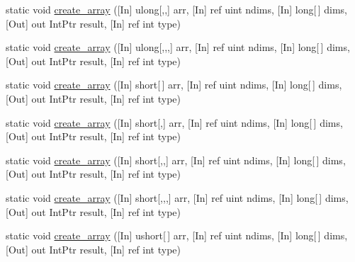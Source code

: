 \begin{DoxyCompactItemize}
\item 
static void \mbox{\hyperlink{classkhiva_1_1interop_1_1_d_l_l_array_abc6c56698c77e653f55a0a569e144ead}{create\+\_\+array}} (\mbox{[}In\mbox{]} ulong\mbox{[},,\mbox{]} arr, \mbox{[}In\mbox{]} ref uint ndims, \mbox{[}In\mbox{]} long\mbox{[}$\,$\mbox{]} dims, \mbox{[}Out\mbox{]} out Int\+Ptr result, \mbox{[}In\mbox{]} ref int type)
\item 
static void \mbox{\hyperlink{classkhiva_1_1interop_1_1_d_l_l_array_a6030188e4f1910685fc53583acfcf6bd}{create\+\_\+array}} (\mbox{[}In\mbox{]} ulong\mbox{[},,,\mbox{]} arr, \mbox{[}In\mbox{]} ref uint ndims, \mbox{[}In\mbox{]} long\mbox{[}$\,$\mbox{]} dims, \mbox{[}Out\mbox{]} out Int\+Ptr result, \mbox{[}In\mbox{]} ref int type)
\item 
static void \mbox{\hyperlink{classkhiva_1_1interop_1_1_d_l_l_array_a2b7e8b6ae9fc35bf465ea4961ec52faf}{create\+\_\+array}} (\mbox{[}In\mbox{]} short\mbox{[}$\,$\mbox{]} arr, \mbox{[}In\mbox{]} ref uint ndims, \mbox{[}In\mbox{]} long\mbox{[}$\,$\mbox{]} dims, \mbox{[}Out\mbox{]} out Int\+Ptr result, \mbox{[}In\mbox{]} ref int type)
\item 
static void \mbox{\hyperlink{classkhiva_1_1interop_1_1_d_l_l_array_a4d884bc823a8c4d1564e43aae4b8a169}{create\+\_\+array}} (\mbox{[}In\mbox{]} short\mbox{[},\mbox{]} arr, \mbox{[}In\mbox{]} ref uint ndims, \mbox{[}In\mbox{]} long\mbox{[}$\,$\mbox{]} dims, \mbox{[}Out\mbox{]} out Int\+Ptr result, \mbox{[}In\mbox{]} ref int type)
\item 
static void \mbox{\hyperlink{classkhiva_1_1interop_1_1_d_l_l_array_a75249f0ad6eee63545bb23f59e778cad}{create\+\_\+array}} (\mbox{[}In\mbox{]} short\mbox{[},,\mbox{]} arr, \mbox{[}In\mbox{]} ref uint ndims, \mbox{[}In\mbox{]} long\mbox{[}$\,$\mbox{]} dims, \mbox{[}Out\mbox{]} out Int\+Ptr result, \mbox{[}In\mbox{]} ref int type)
\item 
static void \mbox{\hyperlink{classkhiva_1_1interop_1_1_d_l_l_array_aadb30ea2d65247d87ec04e8b3f117822}{create\+\_\+array}} (\mbox{[}In\mbox{]} short\mbox{[},,,\mbox{]} arr, \mbox{[}In\mbox{]} ref uint ndims, \mbox{[}In\mbox{]} long\mbox{[}$\,$\mbox{]} dims, \mbox{[}Out\mbox{]} out Int\+Ptr result, \mbox{[}In\mbox{]} ref int type)
\item 
static void \mbox{\hyperlink{classkhiva_1_1interop_1_1_d_l_l_array_a7e7b9e580e70cc03be545145e7d42a74}{create\+\_\+array}} (\mbox{[}In\mbox{]} ushort\mbox{[}$\,$\mbox{]} arr, \mbox{[}In\mbox{]} ref uint ndims, \mbox{[}In\mbox{]} long\mbox{[}$\,$\mbox{]} dims, \mbox{[}Out\mbox{]} out Int\+Ptr result, \mbox{[}In\mbox{]} ref int type)

\end{DoxyCompactItemize}
